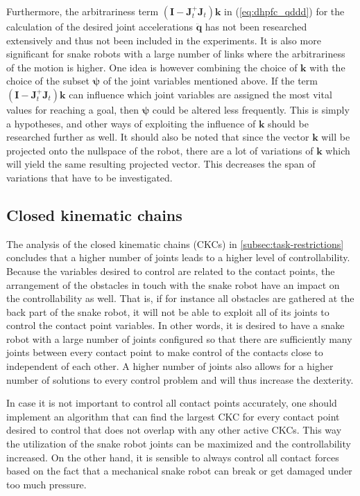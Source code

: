 Furthermore, the arbitrariness term $(\mathbf{I}-  \mathbf{J}_t^+ \mathbf{J}_t)\mathbf{k}$ in (\ref{eq:dhpfc_qddd}) for the calculation of the desired joint accelerations $\ddot{\mathbf{q}}$ has not been researched extensively and thus not been included in the experiments. It is also more significant for snake robots with a large number of links where the arbitrariness of the motion is higher. One idea is however combining the choice of $\mathbf{k}$ with the choice of the subset $\boldsymbol{\psi}$ of the joint variables mentioned above. If the term $(\mathbf{I}-  \mathbf{J}_t^+ \mathbf{J}_t)\mathbf{k}$ can influence which joint variables are assigned the most vital values for reaching a goal, then $\boldsymbol{\psi}$ could be altered less frequently. This is simply a hypotheses, and other ways of exploiting the influence of $\mathbf{k}$ should be researched further as well. It should also be noted that since the vector $\mathbf{k}$ will be projected onto the nullspace of the robot, there are a lot of variations of $\mathbf{k}$ which will yield the same resulting projected vector. This decreases the span of variations that have to be investigated.

\subsection{Closed kinematic chains}

The analysis of the closed kinematic chains (CKCs) in \ref{subsec:task-restrictions} concludes that a higher number of joints leads to a higher level of controllability. Because the variables desired to control are related to the contact points, the arrangement of the obstacles in touch with the snake robot have an impact on the controllability as well. That is, if for instance all obstacles are gathered at the back part of the snake robot, it will not be able to exploit all of its joints to control the contact point variables. In other words, it is desired to have a snake robot with a large number of joints configured so that there are sufficiently many joints between every contact point to make control of the contacts close to independent of each other. A higher number of joints also allows for a higher number of solutions to every control problem and will thus increase the dexterity.

In case it is not important to control all contact points accurately, one should implement an algorithm that can find the largest CKC for every contact point desired to control that does not overlap with any other active CKCs. This way the utilization of the snake robot joints can be maximized and the controllability increased. On the other hand, it is sensible to always control all contact forces based on the fact that a mechanical snake robot can break or get damaged under too much pressure.

